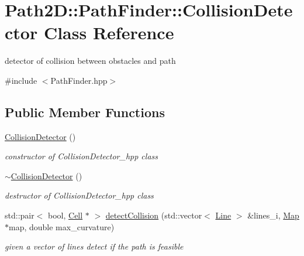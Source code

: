 \hypertarget{class_path2_d_1_1_path_finder_1_1_collision_detector}{}\section{Path2D\+:\+:Path\+Finder\+:\+:Collision\+Detector Class Reference}
\label{class_path2_d_1_1_path_finder_1_1_collision_detector}


detector of collision between obstacles and path  




{\ttfamily \#include $<$Path\+Finder.\+hpp$>$}

\subsection*{Public Member Functions}
\begin{DoxyCompactItemize}
\item 
\mbox{\label{class_path2_d_1_1_path_finder_1_1_collision_detector_ab0dd27f4e4b0e901be9ad1ef7c938949}} 
\mbox{\hyperlink{class_path2_d_1_1_path_finder_1_1_collision_detector_ab0dd27f4e4b0e901be9ad1ef7c938949}{Collision\+Detector}} ()
\begin{DoxyCompactList}\small\item\em constructor of Collision\+Detector\+\_\+hpp class \end{DoxyCompactList}\item 
\mbox{\label{class_path2_d_1_1_path_finder_1_1_collision_detector_a978b6fc7e1d64833e0feb22c41db1383}} 
\mbox{\hyperlink{class_path2_d_1_1_path_finder_1_1_collision_detector_a978b6fc7e1d64833e0feb22c41db1383}{$\sim$\+Collision\+Detector}} ()
\begin{DoxyCompactList}\small\item\em destructor of Collision\+Detector\+\_\+hpp class \end{DoxyCompactList}\item 
std\+::pair$<$ bool, \mbox{\hyperlink{class_cell}{Cell}} $\ast$ $>$ \mbox{\hyperlink{class_path2_d_1_1_path_finder_1_1_collision_detector_a3ff8fb92d990f44157c0b2469b1c9a24}{detect\+Collision}} (std\+::vector$<$ \mbox{\hyperlink{class_path2_d_1_1_element_1_1_line}{Line}} $>$ \&lines\+\_\+i, \mbox{\hyperlink{class_map}{Map}} $\ast$map, double max\+\_\+curvature)
\begin{DoxyCompactList}\small\item\em given a vector of lines detect if the path is feasible \end{DoxyCompactList}\end{DoxyCompactItemize}


